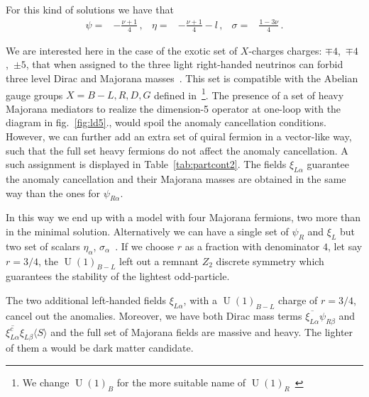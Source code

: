 \documentclass[12pt]{article}
\begin{document}
For this kind of solutions we have that
\begin{align}
  \psi=&-\frac{\nu+1}{4}\,,&\eta=&-\frac{\nu+1}{4}-l\,,&\sigma=&\frac{1-3\nu}{4}\,.
\end{align}



We are interested here in the case of the exotic set of $X$-charges
charges: $\mp 4$,~$\mp 4$,~$\pm 5$, that when assigned to the
three light right-handed neutrinos can forbid three level Dirac and
Majorana masses~\cite{Calle:2018ovc}. This set is compatible with the
Abelian gauge groups $X=B-L,R,D,G$ defined in~\cite{Campos:2017dgc}\footnote{We change $\operatorname{U}(1)_B$ for the more suitable name of $\operatorname{U}(1)_R$~\cite{Jana:2019mez}}.
The presence of a set of heavy Majorana mediators to realize the
dimension-5 operator at one-loop with the diagram in
fig.~\ref{fig:ld5}., would spoil the anomaly cancellation conditions.
However, we can further add an extra set of quiral fermion in a
vector-like way, such that the full set heavy fermions do not affect
the anomaly cancellation. A such assignment is displayed in
Table~\ref{tab:partcont2}.
The fields $\xi_{L \alpha}$ guarantee the anomaly cancellation and
their Majorana masses are obtained in the same way than the ones for
$\psi_{R\alpha}$.



In this way we end up with a model with four Majorana fermions, two more than in the minimal solution. Alternatively we can have a single set of $\psi_R$ and $\xi_L$ but two set of scalars $\eta_\alpha$, $\sigma_{\alpha}$~\cite{Reig:2018mdk}. If we choose $r$ as a fraction with denominator $4$, let say $r=3/4$, the $\operatorname{U}(1)_{B-L}$ left out a remnant $Z_2$ discrete symmetry which guarantees the stability of the lightest odd-particle.

The two additional left-handed fields $\xi_{L\alpha}$,  with a $\operatorname{U}(1)_{B-L}$ charge of $r=3/4$,  cancel out the anomalies. Moreover, we have both Dirac mass terms $\overline{\xi_{L \alpha}}\psi_{R \beta}$ and $ \overline{\xi_{L\alpha}^c }\xi_{L \beta} \langle S\rangle$ and the full set of Majorana fields are massive and heavy. The lighter of them a would be dark matter candidate.
\end{document}
